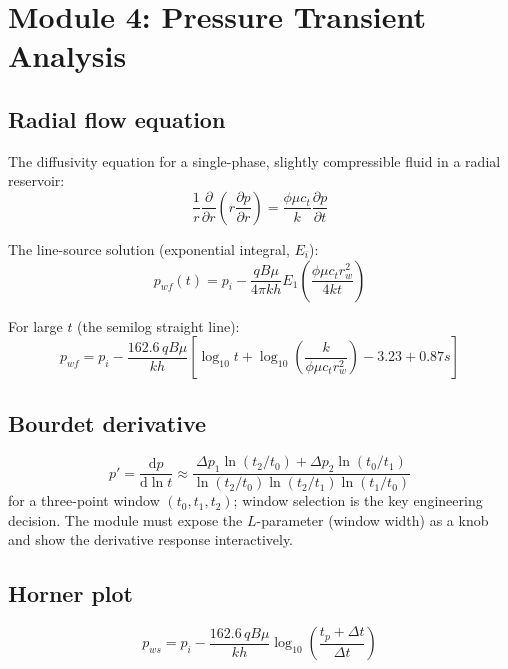\documentclass[11pt,a4paper]{article}
\newcommand{\dd}{\mathrm{d}}
\begin{document}
\section{Module 4: Pressure Transient Analysis}

\subsection{Radial flow equation}
The diffusivity equation for a single-phase, slightly compressible fluid in a
radial reservoir:
\begin{equation}
\frac{1}{r} \frac{\partial}{\partial r}\left( r \frac{\partial p}{\partial r} \right)
= \frac{\phi \mu c_t}{k} \frac{\partial p}{\partial t}
\end{equation}

The line-source solution (exponential integral, $E_i$):
\begin{equation}
p_{wf}(t) = p_i - \frac{q B \mu}{4 \pi k h} E_1\!\left( \frac{\phi \mu c_t r_w^2}{4 k t} \right)
\end{equation}

For large $t$ (the semilog straight line):
\begin{equation}
p_{wf} = p_i - \frac{162.6 \, q B \mu}{k h} \left[ \log_{10} t + \log_{10}\!\left(\frac{k}{\phi \mu c_t r_w^2}\right) - 3.23 + 0.87 s \right]
\end{equation}

\subsection{Bourdet derivative}
\begin{equation}
p' = \frac{\dd p}{\dd \ln t} \approx \frac{\Delta p_1 \ln(t_2/t_0) + \Delta p_2 \ln(t_0/t_1)}{\ln(t_2/t_0) \ln(t_2/t_1) \ln(t_1/t_0)}
\end{equation}
for a three-point window $(t_0, t_1, t_2)$; window selection is the key
engineering decision. The module must expose the $L$-parameter (window width)
as a knob and show the derivative response interactively.

\subsection{Horner plot}
\begin{equation}
p_{ws} = p_i - \frac{162.6 \, q B \mu}{k h} \log_{10}\!\left( \frac{t_p + \Delta t}{\Delta t} \right)
\end{equation}
\end{document}

